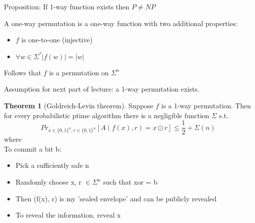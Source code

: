 \documentclass[a4paper,12pt]{article}
\theoremstyle{definition}
\newtheorem{theorem}[counter]{Theorem}
\theoremstyle{remark}
\begin{document}
Proposition: If 1-way function exists then $P \neq NP$

A one-way permutation is a one-way function with two additional properties:
\begin{itemize}
    \item $f$ is one-to-one (injective)
    \item $\forall w \in \Sigma^* |f(w)| = |w|$
\end{itemize}

Follows that $f$ is a permutation on $\Sigma^n$ %

Assumption for next part of lecture: a 1-way permutation exists.

\begin{theorem}[Goldreich-Levin theorem]
    Suppose $f$ is a 1-way permutation. Then for every probabilistic ptime algorithm there is a negligible function 
    $\Sigma$ s.t.
    \begin{equation*}
        Pr_{x \in \{0, 1\}^n, r \in \{0, 1\}^n} [A(f(x), r) = x \odot r] \leq \frac{1}{2} + \Sigma(n)
    \end{equation*}
    where
    \begin{equation*}
        [x \odot r = \sum_{i=1}^{n} x_i r_i mod 2]
    \end{equation*}
    To commit a bit b:
    \begin{itemize}
        \item Pick a sufficiently safe n
        \item Randomly choose x, r $\in \Sigma^n$ such that xor = b
        \item Then (f(x), r) is my 'sealed envelope' and can be publicly revealed
        \item To reveal the information, reveal x
    \end{itemize}
\end{theorem}







\newpage
\end{document}
